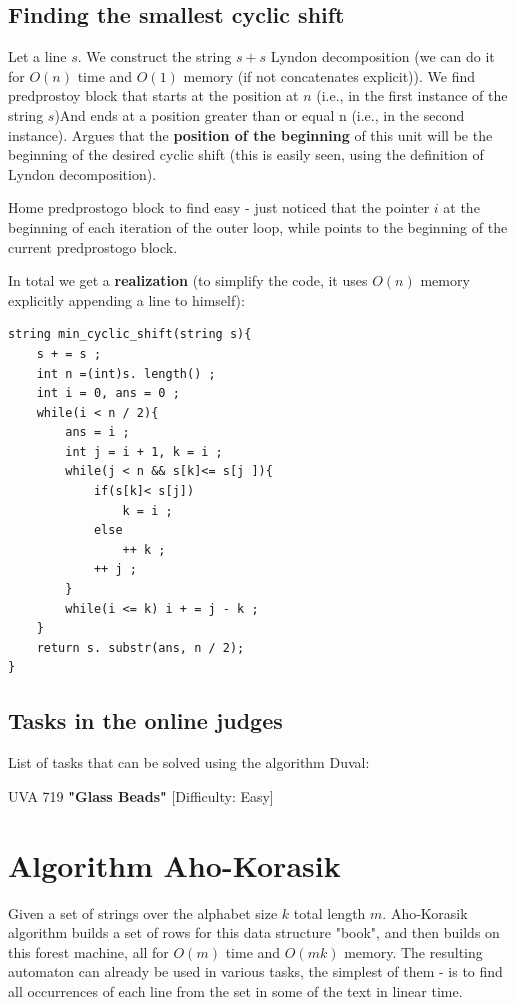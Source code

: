 \subsection{ Finding the smallest cyclic shift }

Let a line $s$. We construct the string $s + s$ Lyndon decomposition (we can do it for $O (n)$ time and $O (1)$ memory (if not concatenates explicit)). We find predprostoy block that starts at the position at $n$ (i.e., in the first instance of the string $s$)And ends at a position greater than or equal n (i.e., in the second instance). Argues that the \textbf{position of the beginning} of this unit will be the beginning of the desired cyclic shift (this is easily seen, using the definition of Lyndon decomposition).

Home predprostogo block to find easy - just noticed that the pointer $i$ at the beginning of each iteration of the outer loop, while points to the beginning of the current predprostogo block.

In total we get a \textbf{realization} (to simplify the code, it uses $O (n)$ memory explicitly appending a line to himself):

\begin{verbatim}
string min_cyclic_shift(string s){
    s + = s ;
    int n =(int)s. length() ;
    int i = 0, ans = 0 ;
    while(i < n / 2){
        ans = i ;
        int j = i + 1, k = i ;
        while(j < n && s[k]<= s[j ]){
            if(s[k]< s[j])
                k = i ;
            else
                ++ k ;
            ++ j ;
        }
        while(i <= k) i + = j - k ;
    }
    return s. substr(ans, n / 2);
} 
\end{verbatim}
\subsection{ Tasks in the online judges }

List of tasks that can be solved using the algorithm Duval:

UVA 719 \textbf{"Glass Beads"} [Difficulty: Easy]
\section{ Algorithm Aho-Korasik }
Given a set of strings over the alphabet size $k$ total length $m$. Aho-Korasik algorithm builds a set of rows for this data structure "book", and then builds on this forest machine, all for $O (m)$ time and $O (m k)$ memory. The resulting automaton can already be used in various tasks, the simplest of them - is to find all occurrences of each line from the set in some of the text in linear time.

